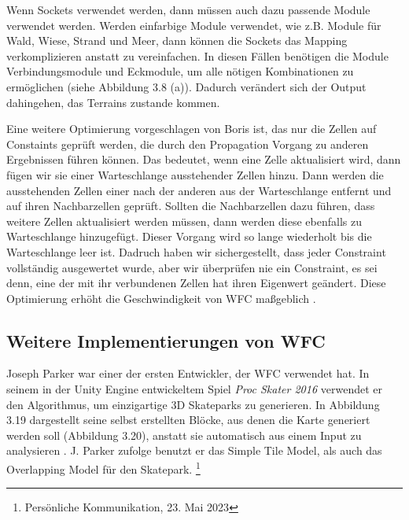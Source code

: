 \documentclass[12pt, a4paper,twoside,openany]{report} %
\begin{document}
Wenn Sockets verwendet werden, dann müssen auch dazu passende Module verwendet werden.
Werden einfarbige Module verwendet, wie z.B. Module für Wald, Wiese, Strand und Meer,
dann können die Sockets das Mapping verkomplizieren anstatt zu vereinfachen.
In diesen Fällen benötigen die Module Verbindungsmodule und Eckmodule, um alle nötigen Kombinationen zu ermöglichen {(siehe Abbildung 3.8 (a))}.
Dadurch verändert sich der Output dahingehen, das  Terrains zustande kommen.

Eine weitere Optimierung vorgeschlagen von Boris ist, das nur die Zellen auf Constaints geprüft werden,
die durch den Propagation Vorgang zu anderen Ergebnissen führen können.
Das bedeutet, wenn eine Zelle aktualisiert wird, dann fügen wir sie einer Warteschlange ausstehender Zellen hinzu.
Dann werden die ausstehenden Zellen einer nach der anderen aus der Warteschlange entfernt und auf ihren Nachbarzellen geprüft.
Sollten die Nachbarzellen dazu führen, dass weitere Zellen aktualisiert werden müssen, dann werden diese ebenfalls zu Warteschlange hinzugefügt.
Dieser Vorgang wird so lange wiederholt bis die Warteschlange leer ist.
Dadruch haben wir sichergestellt,
dass jeder Constraint vollständig ausgewertet wurde, aber wir überprüfen nie ein Constraint,
es sei denn, eine der mit ihr verbundenen Zellen hat ihren Eigenwert geändert.
Diese Optimierung erhöht die Geschwindigkeit von WFC maßgeblich \cite{boris}.

\pagebreak
\subsection{Weitere Implementierungen von WFC}

Joseph Parker war einer der ersten Entwickler, der WFC verwendet hat.
In seinem in der Unity Engine entwickeltem Spiel \textit{Proc Skater 2016} verwendet er den Algorithmus, um einzigartige 3D Skateparks zu generieren.
In Abbildung 3.19 dargestellt seine selbst erstellten Blöcke, aus denen die Karte generiert werden soll {(Abbildung 3.20)}, anstatt sie automatisch aus einem Input zu analysieren \cite{procskater2016}.
J. Parker zufolge benutzt er das Simple Tile Model, als auch das Overlapping Model für den Skatepark. \footnote[5]{Persönliche Kommunikation, 23. Mai 2023}
\end{document}
